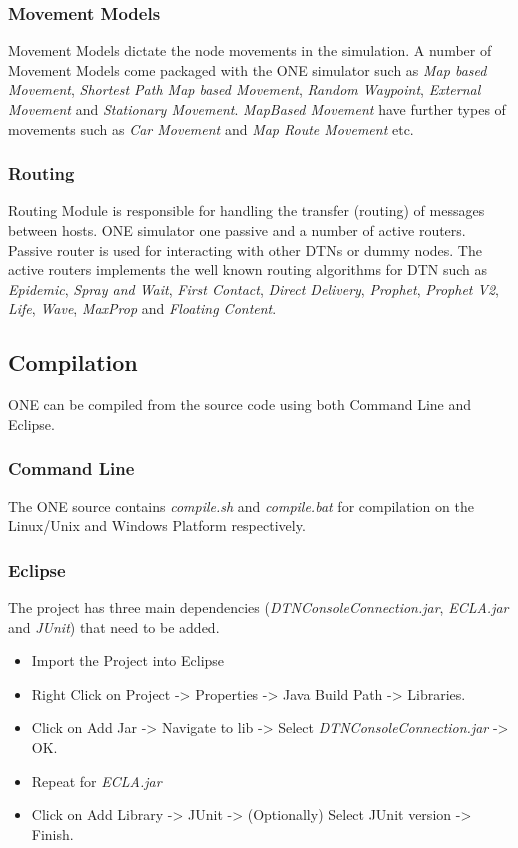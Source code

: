 \subsubsection{Movement Models}
Movement Models dictate the node movements in the simulation. A number of Movement Models come packaged with the ONE simulator such as \textit{Map based Movement}, \textit{Shortest Path Map based Movement}, \textit{Random Waypoint}, \textit{External Movement} and \textit{Stationary Movement}. \textit{MapBased Movement} have further types of movements such as \textit{Car Movement} and \textit{Map Route Movement} etc.
\subsubsection{Routing}
Routing Module is responsible for handling the transfer (routing) of messages between hosts. ONE simulator one passive and a number of active routers. Passive router is used for interacting with other DTNs or dummy nodes. The active routers implements the well known routing algorithms for DTN such as \textit{Epidemic}, \textit{Spray and Wait}, \textit{First Contact}, \textit{Direct Delivery}, \textit{Prophet}, \textit{Prophet V2}, \textit{Life}, \textit{Wave}, \textit{MaxProp} and \textit{Floating Content}.

\subsection{Compilation}
ONE can be compiled from the source code using both Command Line and Eclipse.

\subsubsection{Command Line}
  The ONE source contains \textit{compile.sh} and \textit{compile.bat} for compilation on the Linux/Unix and Windows Platform respectively.

\subsubsection{Eclipse}
The project has three main dependencies (\textit{DTNConsoleConnection.jar}, \textit{ECLA.jar} and \textit{JUnit}) that need to be added. 
\begin{itemize}
  \item Import the Project into Eclipse
  \item Right Click on Project -> Properties -> Java Build Path -> Libraries.
  \item Click on Add Jar -> Navigate to lib -> Select \textit{DTNConsoleConnection.jar} -> OK.
  \item Repeat for \textit{ECLA.jar}
  \item Click on Add Library -> JUnit -> (Optionally) Select JUnit version -> Finish.
\end{itemize}


